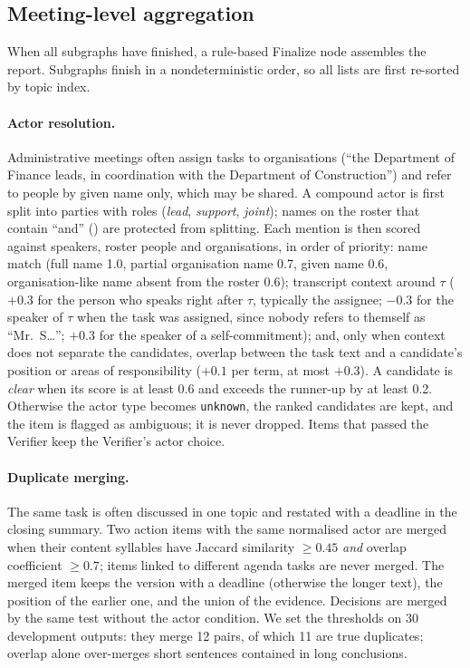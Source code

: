 \subsection{Meeting-level aggregation}
\label{sec:method:finalize}

When all subgraphs have finished, a rule-based Finalize node assembles the report.
Subgraphs finish in a nondeterministic order, so all lists are first re-sorted by topic index.

\paragraph{Actor resolution.}
Administrative meetings often assign tasks to organisations (``the Department of Finance leads, in coordination with the Department of Construction'') and refer to people by given name only, which may be shared.
A compound actor is first split into parties with roles (\emph{lead}, \emph{support}, \emph{joint}); names on the roster that contain ``and'' () are protected from splitting.
Each mention is then scored against speakers, roster people and organisations, in order of priority:
name match (full name 1.0, partial organisation name 0.7, given name 0.6, organisation-like name absent from the roster 0.6);
transcript context around $\tau$ ($+0.3$ for the person who speaks right after $\tau$, typically the assignee; $-0.3$ for the speaker of $\tau$ when the task was assigned, since nobody refers to themself as ``Mr.~S\ldots''; $+0.3$ for the speaker of a self-commitment);
and, only when context does not separate the candidates, overlap between the task text and a candidate's position or areas of responsibility ($+0.1$ per term, at most $+0.3$).
A candidate is \emph{clear} when its score is at least 0.6 and exceeds the runner-up by at least 0.2.
Otherwise the actor type becomes \texttt{unknown}, the ranked candidates are kept, and the item is flagged as ambiguous; it is never dropped.
Items that passed the Verifier keep the Verifier's actor choice.

\paragraph{Duplicate merging.}
The same task is often discussed in one topic and restated with a deadline in the closing summary.
Two action items with the same normalised actor are merged when their content syllables have Jaccard similarity $\ge0.45$ \emph{and} overlap coefficient $\ge0.7$; items linked to different agenda tasks are never merged.
The merged item keeps the version with a deadline (otherwise the longer text), the position of the earlier one, and the union of the evidence.
Decisions are merged by the same test without the actor condition.
We set the thresholds on 30 development outputs: they merge 12 pairs, of which 11 are true duplicates; overlap alone over-merges short sentences contained in long conclusions.

